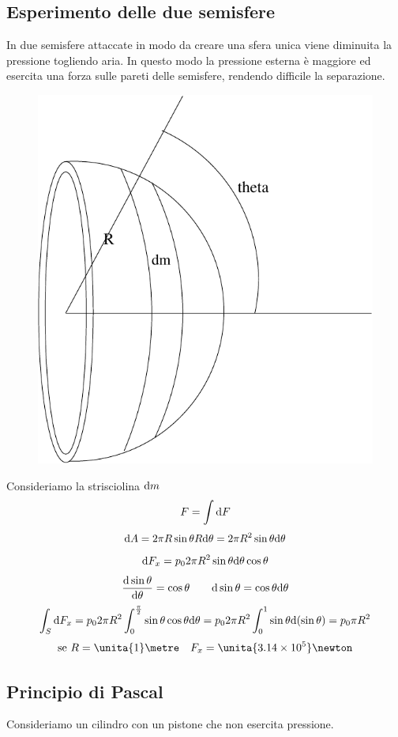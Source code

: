 \subsection{Esperimento delle due semisfere}
In due semisfere attaccate in modo da creare una sfera unica viene diminuita la pressione togliendo aria. In questo modo la pressione esterna è maggiore ed esercita una forza sulle pareti delle semisfere, rendendo difficile la separazione.
\begin{figure}[htbp]
\centering
\includegraphics[scale=0.5]{immagini/fisica1/Sfera_pressione}
\end{figure}

Consideriamo la strisciolina $\mathrm{d} m$
$$F=\int\mathrm{d} F$$
$$\mathrm{d} A=2\pi R\sin\theta R\mathrm{d}\theta=2\pi R^2\sin\theta\mathrm{d}\theta$$
$$\mathrm{d} F_x=p_0 2\pi R^2\sin\theta\mathrm{d}\theta\cos\theta$$
$$\frac{\mathrm{d} \sin\theta}{\mathrm{d} \theta}=\cos\theta\qquad\mathrm{d}\sin\theta=\cos\theta\mathrm{d}\theta$$
$$\int_S \mathrm{d} F_x=p_0 2\pi R^2\int_0^{\frac{\pi}{2}}\sin\theta\cos\theta\mathrm{d}\theta=p_0 2\pi R^2\int_0^{1}\sin\theta\mathrm{d}(\sin\theta)=p_0\pi R^2$$
$$\text{se } R=\unita{1}\metre\quad F_x=\unita{3.14\times 10^5}\newton$$

\subsection{Principio di Pascal}
Consideriamo un cilindro con un pistone che non esercita pressione.

